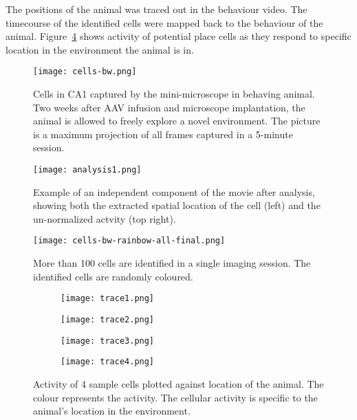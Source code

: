 The positions of the animal was traced out in the behaviour video. The timecourse of the identified cells were mapped back to the behaviour of the animal. Figure~\ref{f.traceplot} shows  activity of potential place cells as they respond to specific location in the environment the animal is in.
\begin{figure}[h]
    \texttt{[image: cells-bw.png]}
    \caption{Cells in CA1 captured by the mini-microscope in behaving animal. Two weeks after AAV infusion and microscope implantation, the animal is allowed to freely explore a novel environment. The picture is a maximum projection of all frames captured in a 5-minute session. \label{f.ca1bw}}
\end{figure}

\begin{figure}[h]
    \texttt{[image: analysis1.png]}
    \caption{Example of an independent component of the movie after analysis, showing both the extracted spatial location of the cell (left) and the un-normalized actvity (top right). \label{f.analysis}}
\end{figure}


\begin{figure}[h]
    \texttt{[image: cells-bw-rainbow-all-final.png]}
    \caption{More than 100 cells are identified in a single imaging session. The identified cells are randomly coloured. \label{f.ca1rainbow}}
\end{figure}


\begin{figure}[h]
    \begin{subfigure}[t]{.5\linewidth}
        \texttt{[image: trace1.png]}
    \end{subfigure}
    \begin{subfigure}[t]{.5\linewidth}
        \texttt{[image: trace2.png]}
    \end{subfigure}
    \begin{subfigure}[t]{.5\linewidth}
        \texttt{[image: trace3.png]}
    \end{subfigure}
    \begin{subfigure}[t]{.5\linewidth}
        \texttt{[image: trace4.png]}
    \end{subfigure}
    \caption{Activity of 4 sample cells plotted against location of the animal. The colour represents the  activity. The cellular activity is specific to the animal's location in the environment. \label{f.traceplot}}
\end{figure}

